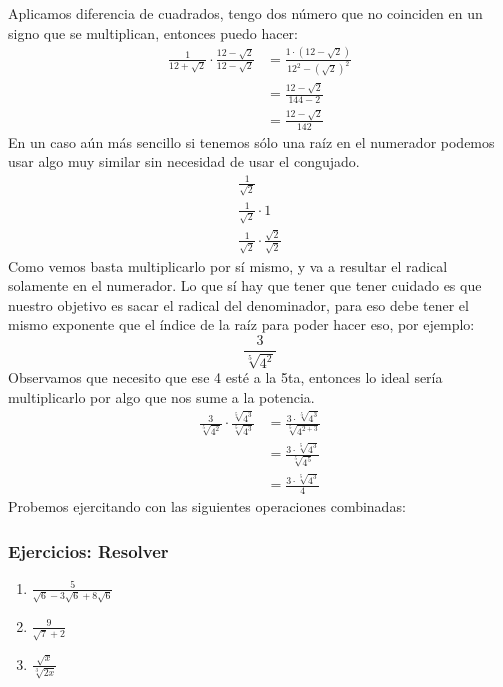 \documentclass[a4paper]{article}
\begin{document}
Aplicamos diferencia de cuadrados, tengo dos número que no coinciden en un signo que se multiplican, entonces puedo hacer:
\begin{align*}
    \frac{1}{12+\sqrt{2}} \cdot \frac{12-\sqrt{2}}{12-\sqrt{2}} &= \frac{1 \cdot (12-\sqrt{2})}{12^2-(\sqrt{2})^2}\\
    &=\frac{12-\sqrt{2}}{144-2}\\
    &=\frac{12-\sqrt{2}}{142}
\end{align*}
En un caso aún más sencillo si tenemos sólo una raíz en el numerador podemos usar algo muy similar sin necesidad de usar el congujado.
\begin{gather*}
    \frac{1}{\sqrt{2}}\\
    \frac{1}{\sqrt{2}} \cdot 1 \\
    \frac{1}{\sqrt{2}} \cdot \frac{\sqrt{2}}{\sqrt{2}}
\end{gather*}
Como vemos basta multiplicarlo por sí mismo, y va a resultar el radical solamente en el numerador. Lo que sí hay que tener que tener cuidado es que nuestro objetivo es sacar el radical del denominador, para eso debe tener el mismo exponente que el índice de la raíz para poder hacer eso, por ejemplo:
\begin{equation*}
    \frac{3}{\sqrt[5]{4^2}}  
\end{equation*}
Observamos que necesito que ese 4 esté a la 5ta, entonces lo ideal sería multiplicarlo por algo que nos sume a la potencia.
\begin{align*}
    \frac{3}{\sqrt[5]{4^2}} \cdot  \frac{\sqrt[5]{4^3}}{\sqrt[5]{4^3}}&= \frac{3 \cdot \sqrt[5]{4^3}}{\sqrt[5]{4^{2+3}}}\\
    &= \frac{3 \cdot \sqrt[5]{4^3}}{\sqrt[5]{4^5}}\\
    &= \frac{3 \cdot \sqrt[5]{4^3}}{4}
\end{align*}
Probemos ejercitando con las siguientes operaciones combinadas:
\subsubsection{Ejercicios: Resolver}
\begin{enumerate}
    \item $\frac{5}{\sqrt{6}-3\sqrt{6}+8\sqrt{6}}$
    \item $\frac{9}{\sqrt{7}+2}$
    \item $\frac{\sqrt{x}}{\sqrt[3]{2x}}$
\end{enumerate}
\end{document}

